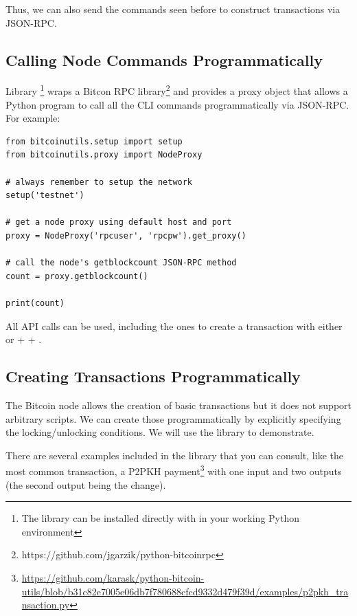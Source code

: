 Thus, we can also send the commands seen before to construct transactions via JSON-RPC.


\subsection*{Calling Node Commands Programmatically}
\label{ssec:calling-node-programmatically}

Library \footnote{The library can be installed directly with  in your working Python environment} wraps a Bitcon RPC library\footnote{https://github.com/jgarzik/python-bitcoinrpc} and provides a proxy object that allows a Python program to call all the CLI commands programmatically via JSON-RPC. For example:

\vspace{1em}
\begin{lstlisting}[style=Python]
from bitcoinutils.setup import setup
from bitcoinutils.proxy import NodeProxy

# always remember to setup the network
setup('testnet')

# get a node proxy using default host and port
proxy = NodeProxy('rpcuser', 'rpcpw').get_proxy()

# call the node's getblockcount JSON-RPC method
count = proxy.getblockcount()

print(count)
\end{lstlisting}
\vspace{1em}

All API calls can be used, including the ones to create a transaction with either  or  +  + .



\subsection*{Creating Transactions Programmatically}

The Bitcoin node allows the creation of basic transactions but it does not support arbitrary scripts. We can create those programmatically by explicitly specifying the locking/unlocking conditions. We will use the  library to demonstrate.

There are several examples included in the library that you can consult, like the most common transaction, a P2PKH payment\footnote{\url{https://github.com/karask/python-bitcoin-utils/blob/b31c82e7005e06db7f780688cfcd9332d479f39d/examples/p2pkh_transaction.py}} with one input and two outputs (the second output being the change).

